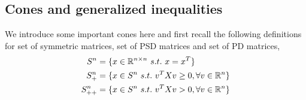 %
%
%	
%	
%
%	
%
%	
%	
%	
%

\vspace{0.4cm}
\subsection{Cones and generalized inequalities}
We introduce some important cones here and first recall the following definitions for set of symmetric matrices, set of PSD matrices and set of PD matrices,
\begin{align*}
S^n &= \{x\in \mathbb{R}^{n\times n}\ s.t.\ x = x^T \}\\
S^n_+ &= \{x\in S^{n}\ s.t.\ v^TXv \geq 0, \forall v\in \mathbb{R}^n \}\\
S^n_{++} &= \{x\in S^{n}\ s.t.\ v^TXv > 0 ,\forall v\in \mathbb{R}^n\}
\end{align*}

